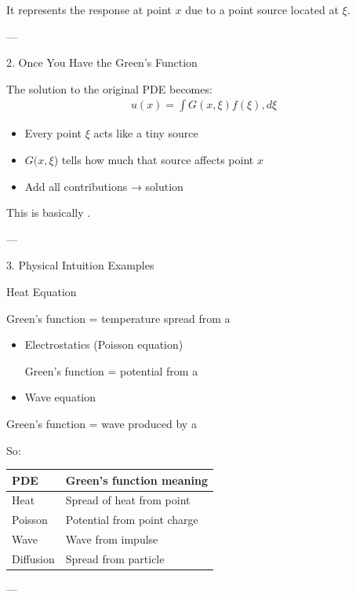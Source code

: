 \documentclass[12pt,a4paper]{report}
\begin{document}
{\begin{description}
It represents the response at point $x$ due to a point source located at $\xi$.

---

\item 2. Once You Have the Green’s Function

The solution to the original PDE becomes:
\begin{align*}
u(x) = \int G(x,\xi) f(\xi), d\xi
\end{align*}

\begin{itemize}
\item Every point $ \xi $ acts like a tiny source
\item $G(x,\xi$) tells how much that source affects point $x$
\item Add all contributions → solution
\end{itemize}

This is basically .

---

\item 3. Physical Intuition Examples

\item Heat Equation

Green’s function = temperature spread from a 
\begin{itemize}
\item Electrostatics (Poisson equation)

Green’s function = potential from a 

\item Wave equation
\end{itemize}

Green’s function = wave produced by a 

So:

\begin{tabular}{|l|l|}
\hline
 PDE       & Green’s function meaning    \\
\hline
 Heat      & Spread of heat from point   \\
 Poisson   & Potential from point charge \\
 Wave      & Wave from impulse           \\
 Diffusion & Spread from particle        \\
\hline
\end{tabular}

---


\end{description}}
\end{document}
